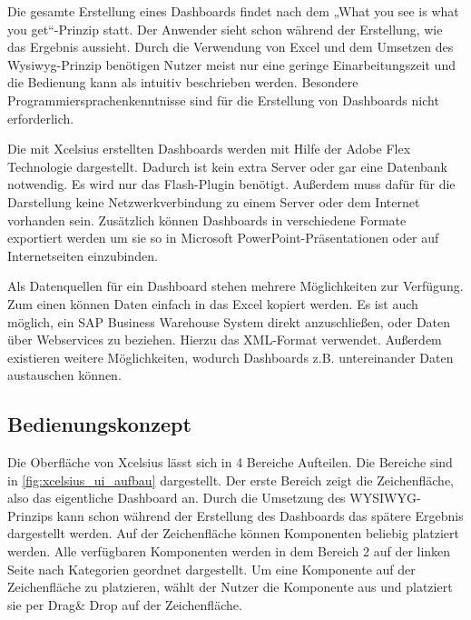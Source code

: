 Die gesamte Erstellung eines Dashboards findet nach dem „What you see is what you get“-Prinzip statt. Der Anwender sieht schon während der Erstellung, wie das Ergebnis aussieht. Durch die Verwendung von Excel und dem Umsetzen des Wysiwyg-Prinzip benötigen Nutzer meist nur eine geringe Einarbeitungszeit und die Bedienung kann als intuitiv beschrieben werden. Besondere Programmiersprachenkenntnisse sind für die Erstellung von Dashboards nicht erforderlich.

Die mit Xcelsius erstellten Dashboards werden mit Hilfe der Adobe Flex Technologie dargestellt. Dadurch ist kein extra Server oder gar eine Datenbank notwendig. Es wird nur das Flash-Plugin benötigt. Außerdem muss dafür für die Darstellung keine Netzwerkverbindung zu einem Server oder dem Internet vorhanden sein.  Zusätzlich können Dashboards in verschiedene Formate exportiert werden um sie so in Microsoft PowerPoint-Präsentationen oder auf Internetseiten einzubinden.

Als Datenquellen für ein Dashboard stehen mehrere Möglichkeiten zur Verfügung. Zum einen können Daten einfach in das Excel kopiert werden.  Es ist auch möglich, ein SAP Business Warehouse System direkt anzuschließen, oder Daten über Webservices zu beziehen. Hierzu das XML-Format verwendet. Außerdem existieren weitere Möglichkeiten, wodurch Dashboards z.B. untereinander Daten austauschen können.

\subsection{Bedienungskonzept}
Die Oberfläche von Xcelsius lässt sich in 4 Bereiche Aufteilen. Die Bereiche sind in \vref{fig:xcelsius_ui_aufbau} dargestellt. Der erste Bereich zeigt die Zeichenfläche, also das eigentliche Dashboard an. Durch die Umsetzung des WYSIWYG-Prinzips kann schon während der Erstellung des Dashboards das spätere Ergebnis dargestellt werden. Auf der Zeichenfläche können Komponenten beliebig platziert werden. Alle verfügbaren Komponenten werden in dem Bereich 2 auf der linken Seite nach Kategorien geordnet dargestellt. Um eine Komponente auf der Zeichenfläche zu platzieren, wählt der Nutzer die Komponente aus und platziert sie per Drag\& Drop auf der Zeichenfläche. 

